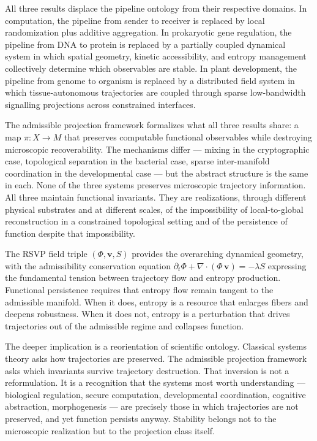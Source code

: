 \documentclass[12pt, a4paper]{article}
\theoremstyle{essaystyle}
\begin{document}
All three results displace the pipeline ontology from their respective domains.
In computation, the pipeline from sender to receiver is replaced by local randomization
plus additive aggregation. In prokaryotic gene regulation, the pipeline from DNA to
protein is replaced by a partially coupled dynamical system in which spatial geometry,
kinetic accessibility, and entropy management collectively determine which observables
are stable. In plant development, the pipeline from genome to organism is replaced by
a distributed field system in which tissue-autonomous trajectories are coupled through
sparse low-bandwidth signalling projections across constrained interfaces.

The admissible projection framework formalizes what all three results share: a map
$\pi : X \to M$ that preserves computable functional observables while destroying
microscopic recoverability. The mechanisms differ --- mixing in the cryptographic case,
topological separation in the bacterial case, sparse inter-manifold coordination in the
developmental case --- but the abstract structure is the same in each. None of the
three systems preserves microscopic trajectory information. All three maintain functional
invariants. They are realizations, through different physical substrates and at
different scales, of the impossibility of local-to-global reconstruction in a
constrained topological setting and of the persistence of function despite that
impossibility.

The RSVP field triple $(\Phi, \mathbf{v}, S)$ provides the overarching dynamical
geometry, with the admissibility conservation equation $\partial_t \Phi + \nabla \cdot
(\Phi\,\mathbf{v}) = -\lambda S$ expressing the fundamental tension between trajectory
flow and entropy production. Functional persistence requires that entropy flow remain
tangent to the admissible manifold. When it does, entropy is a resource that enlarges
fibers and deepens robustness. When it does not, entropy is a perturbation that drives
trajectories out of the admissible regime and collapses function.

The deeper implication is a reorientation of scientific ontology. Classical systems
theory asks how trajectories are preserved. The admissible projection framework asks
which invariants survive trajectory destruction. That inversion is not a reformulation.
It is a recognition that the systems most worth understanding --- biological regulation,
secure computation, developmental coordination, cognitive abstraction, morphogenesis ---
are precisely those in which trajectories are not preserved, and yet function persists
anyway. Stability belongs not to the microscopic realization but to the projection
class itself.
\end{document}
